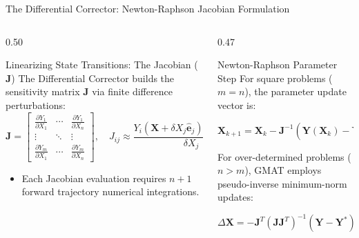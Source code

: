\documentclass[aspectratio=169, 10pt]{beamer}
\begin{document}
\begin{frame}{The Differential Corrector: Newton-Raphson Jacobian Formulation}
    \begin{columns}[t]
        \begin{column}{0.50\textwidth}
            \begin{block}{Linearizing State Transitions: The Jacobian ($\mathbf{J}$)}
                \scriptsize
                The Differential Corrector builds the sensitivity matrix $\mathbf{J}$ via finite difference perturbations:
                \vspace{-0.05cm}
                \begin{equation*}
                    \mathbf{J} = \begin{bmatrix}
                        \frac{\partial Y_1}{\partial X_1} & \cdots & \frac{\partial Y_1}{\partial X_n} \\
                        \vdots & \ddots & \vdots \\
                        \frac{\partial Y_m}{\partial X_1} & \cdots & \frac{\partial Y_m}{\partial X_n}
                    \end{bmatrix}, \quad 
                    J_{ij} \approx \frac{Y_i(\mathbf{X} + \delta X_j \hat{\mathbf{e}}_j) - Y_i(\mathbf{X})}{\delta X_j}
                \end{equation*}
                \vspace{-0.15cm}
                \begin{itemize}\setlength{\itemsep}{1pt}
                    \item Each Jacobian evaluation requires $n+1$ forward trajectory numerical integrations.
                \end{itemize}
            \end{block}
        \end{column}

        \begin{column}{0.47\textwidth}
            \begin{block}{Newton-Raphson Parameter Step}
                \scriptsize
                For square problems ($m = n$), the parameter update vector is:
                \par\vspace{1pt}
                {\centering $\mathbf{X}_{k+1} = \mathbf{X}_k - \mathbf{J}^{-1} \left(\mathbf{Y}(\mathbf{X}_k) - \mathbf{Y}^*\right)$\par}
                \vspace{2pt}
                For over-determined problems ($n > m$), GMAT employs pseudo-inverse minimum-norm updates:
                \par\vspace{1pt}
                {\centering $\Delta \mathbf{X} = -\mathbf{J}^T (\mathbf{J} \mathbf{J}^T)^{-1} \left(\mathbf{Y} - \mathbf{Y}^*\right)$\par}
            \end{block}


\end{column}
\end{columns}
\end{frame}
\end{document}
